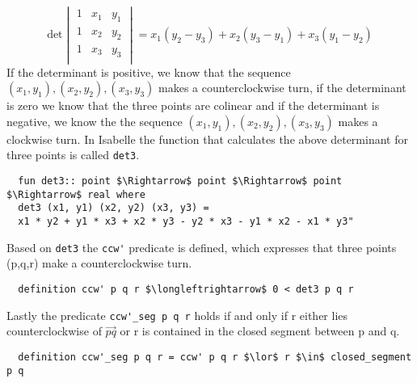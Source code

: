 \[
\text{det} 
\begin{vmatrix}
1 & x_1 & y_1 \\
1 & x_2 & y_2 \\
1 & x_3 & y_3 \\
\end{vmatrix}
= x_1 (y_2 - y_3 ) + x_2 (y_3 - y_1)+ x_3  (y_1 - y_2)
\]
If the determinant is positive, we know that the sequence $(x_1,y_1), (x_2,y_2) , (x_3,y_3)$
makes a counterclockwise turn, if the determinant is zero we know that the three points are colinear 
and if the determinant is negative, we know the the sequence $(x_1,y_1), (x_2,y_2) , (x_3,y_3)$
makes a clockwise turn. %
In Isabelle the function that calculates the above determinant for three 
points is called \lstinline|det3|.
\begin{lstlisting}
  fun det3:: point $\Rightarrow$ point $\Rightarrow$ point $\Rightarrow$ real where 
  det3 (x1, y1) (x2, y2) (x3, y3) =
  x1 * y2 + y1 * x3 + x2 * y3 - y2 * x3 - y1 * x2 - x1 * y3"
\end{lstlisting}
Based on \lstinline|det3| the \lstinline|ccw'| predicate is defined, which expresses that 
three points (p,q,r) make a counterclockwise turn.
\begin{lstlisting}
  definition ccw' p q r $\longleftrightarrow$ 0 < det3 p q r
\end{lstlisting}
Lastly the predicate \lstinline|ccw'_seg p q r| holds if and only if r either lies 
counterclockwise of $\vec{pq}$ or r is contained in the closed segment between p and q.
\begin{lstlisting}
  definition ccw'_seg p q r = ccw' p q r $\lor$ r $\in$ closed_segment p q
\end{lstlisting}
